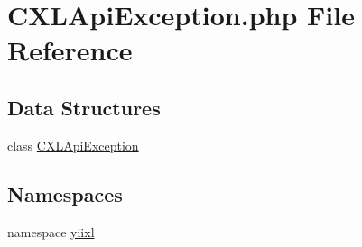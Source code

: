 \hypertarget{CXLApiException_8php}{
\section{CXLApiException.php File Reference}
\label{CXLApiException_8php}
}
\subsection*{Data Structures}
\begin{DoxyCompactItemize}
\item 
class \hyperlink{classCXLApiException}{CXLApiException}
\end{DoxyCompactItemize}
\subsection*{Namespaces}
\begin{DoxyCompactItemize}
\item 
namespace \hyperlink{namespaceyiixl}{yiixl}
\end{DoxyCompactItemize}
